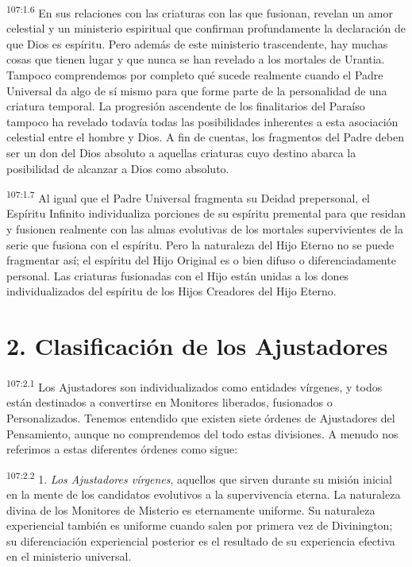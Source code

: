 \documentclass[twoside, 11pt]{book}
\begin{document}
\par
\textsuperscript{107:1.6} En sus relaciones con las criaturas con las que fusionan, revelan un amor celestial y un ministerio espiritual que confirman profundamente la declaración de que Dios es espíritu. Pero además de este ministerio trascendente, hay muchas cosas que tienen lugar y que nunca se han revelado a los mortales de Urantia. Tampoco comprendemos por completo qué sucede realmente cuando el Padre Universal da algo de sí mismo para que forme parte de la personalidad de una criatura temporal. La progresión ascendente de los finalitarios del Paraíso tampoco ha revelado todavía todas las posibilidades inherentes a esta asociación celestial entre el hombre y Dios. A fin de cuentas, los fragmentos del Padre deben ser un don del Dios absoluto a aquellas criaturas cuyo destino abarca la posibilidad de alcanzar a Dios como absoluto.

\par
\textsuperscript{107:1.7} Al igual que el Padre Universal fragmenta su Deidad prepersonal, el Espíritu Infinito individualiza porciones de su espíritu premental para que residan y fusionen realmente con las almas evolutivas de los mortales supervivientes de la serie que fusiona con el espíritu. Pero la naturaleza del Hijo Eterno no se puede fragmentar así; el espíritu del Hijo Original es o bien difuso o diferenciadamente personal. Las criaturas fusionadas con el Hijo están unidas a los dones individualizados del espíritu de los Hijos Creadores del Hijo Eterno.

\section*{2. Clasificación de los Ajustadores}
\par
\textsuperscript{107:2.1} Los Ajustadores son individualizados como entidades vírgenes, y todos están destinados a convertirse en Monitores liberados, fusionados o Personalizados. Tenemos entendido que existen siete órdenes de Ajustadores del Pensamiento, aunque no comprendemos del todo estas divisiones. A menudo nos referimos a estas diferentes órdenes como sigue:

\par
\textsuperscript{107:2.2} 1. \textit{Los Ajustadores vírgenes}, aquellos que sirven durante su misión inicial en la mente de los candidatos evolutivos a la supervivencia eterna. La naturaleza divina de los Monitores de Misterio es eternamente uniforme. Su naturaleza experiencial también es uniforme cuando salen por primera vez de Divinington; su diferenciación experiencial posterior es el resultado de su experiencia efectiva en el ministerio universal.
\end{document}
